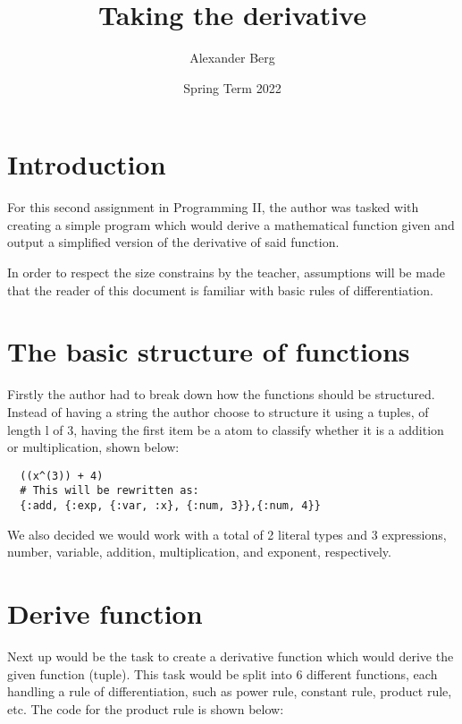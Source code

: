 \documentclass[a4paper,11pt]{article}
\begin{document}
\title{
    \textbf{Taking the derivative}
}
\author{Alexander Berg}
\date{Spring Term 2022}

\maketitle

\section*{Introduction}

For this second assignment in Programming II, the author was tasked with creating a simple program which would derive a mathematical function given and output a simplified version of the derivative of said function. 

In order to respect the size constrains by the teacher, assumptions will be made that the reader of this document is familiar with basic rules of differentiation.

\section*{The basic structure of functions}

Firstly the author had to break down how the functions should be structured. Instead of having a string the author choose to structure it using a tuples, of length l of 3, having the first item be a atom to classify whether it is a addition or multiplication, shown below:

\begin{verbatim}
  ((x^(3)) + 4)
  # This will be rewritten as:
  {:add, {:exp, {:var, :x}, {:num, 3}},{:num, 4}}
\end{verbatim}

We also decided we would work with a total of 2 literal types and 3 expressions, number, variable, addition, multiplication, and exponent, respectively.

\section*{Derive function}

Next up would be the task to create a derivative function which would derive the given function (tuple). This task would be split into 6 different functions, each handling a rule of differentiation, such as power rule, constant rule, product rule, etc. The code for the product rule is shown below:
\end{document}
